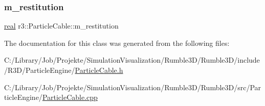 \mbox{\label{classr3_1_1_particle_cable_ad03466bf1aeecddec5fd0319be7b2e3d}} 
\subsubsection{\texorpdfstring{m\+\_\+restitution}{m\_restitution}}
{\footnotesize\ttfamily \mbox{\hyperlink{namespacer3_ab2016b3e3f743fb735afce242f0dc1eb}{real}} r3\+::\+Particle\+Cable\+::m\+\_\+restitution\hspace{0.3cm}{\ttfamily [protected]}}



The documentation for this class was generated from the following files\+:\begin{DoxyCompactItemize}
\item 
C\+:/\+Library/\+Job/\+Projekte/\+Simulation\+Visualization/\+Rumble3\+D/\+Rumble3\+D/include/\+R3\+D/\+Particle\+Engine/\mbox{\hyperlink{_particle_cable_8h}{Particle\+Cable.\+h}}\item 
C\+:/\+Library/\+Job/\+Projekte/\+Simulation\+Visualization/\+Rumble3\+D/\+Rumble3\+D/src/\+Particle\+Engine/\mbox{\hyperlink{_particle_cable_8cpp}{Particle\+Cable.\+cpp}}\end{DoxyCompactItemize}
